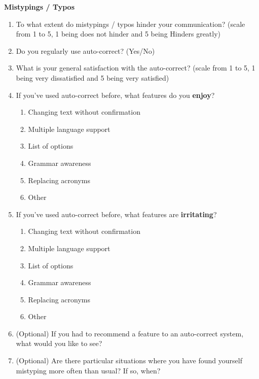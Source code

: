 \documentclass[acmsmall,screen,authorversion,nonacm]{acmart}
\begin{document}
\textbf{Mistypings / Typos}
\begin{enumerate}
    \item To what extent do mistypings / typos hinder your communication? (scale from 1 to 5, 1 being does not hinder and 5 being Hinders greatly)
    \item Do you regularly use auto-correct? (Yes/No)
    \item What is your general satisfaction with the auto-correct? (scale from 1 to 5, 1 being very dissatisfied and 5 being very satisfied)
    \item If you've used auto-correct before, what features do you \textbf{enjoy}?
        \begin{enumerate}
            \item Changing text without confirmation
            \item Multiple language support
            \item List of options
            \item Grammar awareness
            \item Replacing acronyms
            \item Other
        \end{enumerate}
    \item If you've used auto-correct before, what features are \textbf{irritating}?
        \begin{enumerate}
            \item Changing text without confirmation
            \item Multiple language support
            \item List of options
            \item Grammar awareness
            \item Replacing acronyms
            \item Other
        \end{enumerate}
    \item (Optional) If you had to recommend a feature to an auto-correct system, what would you like to see?
    \item (Optional) Are there particular situations where you have found yourself mistyping more often than usual? If so, when?
\end{enumerate}
\end{document}
